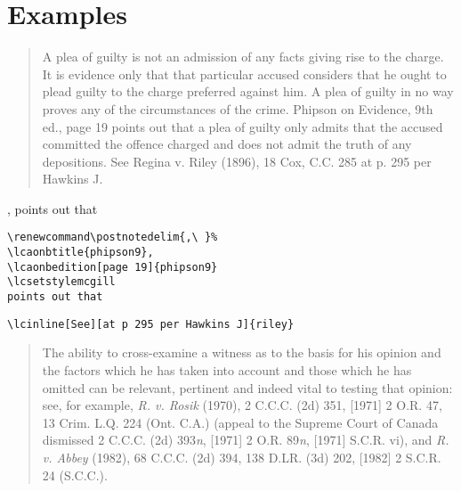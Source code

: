 \newpage
\lcsetstylemcgill
\section{Examples}

\begin{quotation}
A plea of guilty is not an
admission of any facts giving rise to the charge. It is
evidence only that that particular accused considers that he
ought to plead guilty to the charge preferred against him. A
plea of guilty in no way proves any of the circumstances of the
crime. Phipson on Evidence, 9th ed., page 19 points out that a
plea of guilty only admits that the accused committed the
offence charged and does not admit the truth of any
depositions. See Regina v. Riley (1896), 18 Cox, C.C. 285 at
p. 295 per Hawkins J. 
\end{quotation}

\renewcommand\postnotedelim{,\ }%
, 
\lcsetstylemcgill
points out that

\renewcommand\postnotedelim{,\ }%
\fbox{, }
\lcsetstylemcgill
{}


\begin{magpar}
\begin{verbatim}
\renewcommand\postnotedelim{,\ }%
\lcaonbtitle{phipson9}, 
\lcaonbedition[page 19]{phipson9} 
\lcsetstylemcgill
points out that
\end{verbatim}
\end{magpar}


\bigskip
{}


\begin{magpar}
\begin{verbatim}
\lcinline[See][at p 295 per Hawkins J]{riley}
\end{verbatim}
\end{magpar}

%

\newpage
\begin{quotation}
The ability to cross-examine a witness as to the basis for his opinion and the factors which he has taken into account and those which he has omitted can be relevant, pertinent and indeed vital to testing  that opinion: see, for example, \textit{ R. v. Rosik} (1970), 2 C.C.C. (2d) 351, [1971] 2 O.R. 47, 13 Crim. L.Q. 224 (Ont. C.A.) (appeal to the Supreme Court of Canada dismissed 2 C.C.C. (2d) 393\textit{n}, [1971] 2 O.R. 89\textit{n}, [1971] S.C.R. vi), and \textit{R. v. Abbey} (1982), 68 C.C.C. (2d) 394, 138 D.LR. (3d) 202, [1982] 2 S.C.R. 24 (S.C.C.).
\end{quotation}


